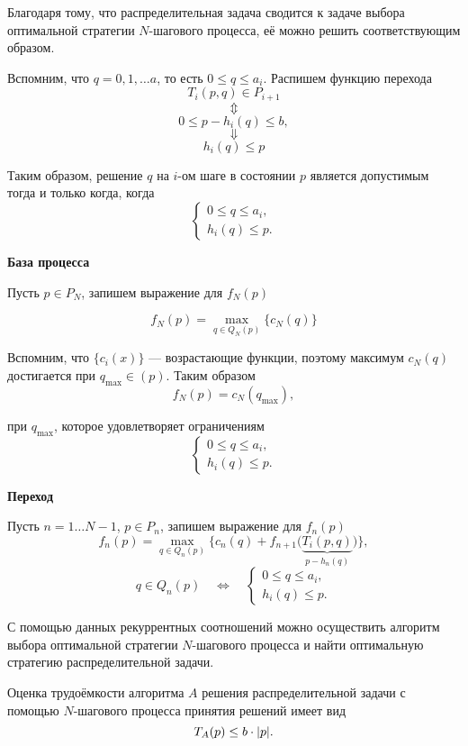 
Благодаря тому, что распределительная задача сводится к задаче выбора оптимальной стратегии $N$-шагового процесса, её можно решить соответствующим образом.

Вспомним, что $q = 0, 1, \dots a$, то есть $\boxed{0 \le q \le a_i}$. Распишем функцию перехода
\[
T_i(p, q) \in P_{i+1}
\]
\[
\Updownarrow
\]
\[
0 \le p - h_i(q) \le b,
\]
\[
\Downarrow
\]
\[
\boxed{h_i(q) \le p}
\]

Таким образом, решение $q$ на $i$-ом шаге в состоянии $p$ является допустимым тогда и только когда, когда
\[
\begin{cases}
	0 \le q \le a_i, \\
	h_i(q) \le p.
\end{cases}
\]

\bigskip

\textbf{База процесса}

Пусть $p \in P_N$, запишем выражение для $f_N(p)$

\[
f_N(p) = \max_{q \in Q_N(p)} \{c_N(q)\}
\]

Вспомним, что $\{c_i(x)\}$ --- возрастающие функции, поэтому максимум $c_N(q)$ достигается при $q_{\max} \in (p)$. Таким образом
\[
f_N(p) = c_N(q_{\max}),
\]

при $q_{\max}$, которое удовлетворяет ограничениям
\[
\begin{cases}
	0 \le q \le a_i, \\
	h_i(q) \le p.
\end{cases}
\]

\bigskip

\textbf{Переход}

Пусть $n = 1 \dots N-1$, $p \in P_n$, запишем выражение для $f_n(p)$
\[
f_n(p) = \max_{q \in Q_n(p)} \big\{c_n(q) + f_{n+1}\big(\underbrace{T_i(p, q)}_{p - h_n(q)}\big)\big\},
\]
\[
q \in Q_n(p) \quad \Longleftrightarrow \quad \begin{cases}
	0 \le q \le a_i, \\
	h_i(q) \le p.
\end{cases}
\]

С помощью данных рекуррентных соотношений можно осуществить алгоритм выбора оптимальной стратегии $N$-шагового процесса и найти оптимальную стратегию распределительной задачи.

\fact

Оценка трудоёмкости алгоритма $A$ решения распределительной задачи с помощью $N$-шагового процесса принятия решений имеет вид
\[
T_A(p) \le b \cdot \abs{p}.
\]


